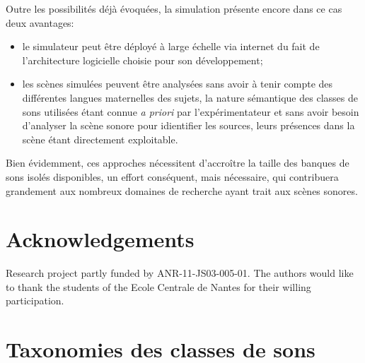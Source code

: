 \documentclass[twoside,twocolumn]{article}
\begin{document}
Outre les possibilités déjà évoquées, la simulation présente encore dans ce cas deux avantages:

\begin{itemize}
\item le simulateur peut être déployé à large échelle via internet du fait de l'architecture logicielle choisie pour son développement;
\item les scènes simulées peuvent être analysées sans avoir à tenir compte des différentes langues maternelles des sujets, la nature sémantique des classes de sons utilisées étant connue \emph{a priori} par l'expérimentateur et sans avoir besoin d'analyser la scène sonore pour idientifier les sources, leurs présences dans la scène étant directement exploitable.
\end{itemize}

Bien évidemment, ces approches nécessitent d'accroître la taille des banques de sons isolés disponibles, un effort conséquent, mais nécessaire, qui contribuera grandement aux nombreux domaines de recherche ayant trait aux scènes sonores.


\section*{\normalsize Acknowledgements}
\setlength{\parindent}{0.7cm}
Research project partly funded by ANR-11-JS03-005-01. The authors would like to thank the students of the Ecole Centrale de Nantes for their willing participation.





\onecolumn

\appendix
\section{Taxonomies des classes de sons}
\label{app:taxonomie}
\end{document}
